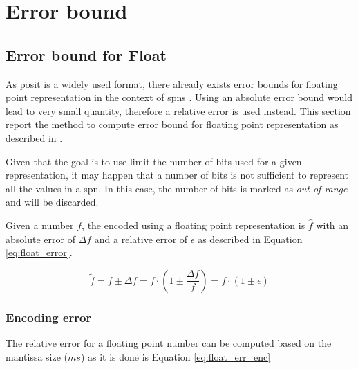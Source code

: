 
\chapter{Error bound}
\label{cha:eb}


\section{Error bound for Float}
As posit is a widely used format, there already exists error bounds for floating point representation in the context of \glspl{spn} \cite{errorbound_float}. Using an absolute error bound would lead to very small quantity, therefore a relative error is used instead. This section report the method to compute error bound for floating point representation as described in \cite{errorbound_float}.


\noindent Given that the goal is to use limit the number of bits used for a given representation, it may happen that a number of bits is not sufficient to represent all the values in a \gls{spn}. In this case, the number of bits is marked as \textit{out of range} and will be discarded.

\smallbreak

Given a number $f$, the encoded using a floating point representation is $\hat{f}$ with an absolute error of $\Delta f$ and a relative error of $\epsilon$ as described in Equation \ref{eq:float_error}.

\begin{equation}
	\tilde{f} = f \pm \Delta f = f \cdot \left(1 \pm \frac{\Delta f}{f} \right) = f \cdot (1 \pm \epsilon)
	\label{eq:float_error}
\end{equation}


\subsection{Encoding error}
The relative error for a floating point number can be computed based on the mantissa size ($ms$) as it is done is Equation \ref{eq:float_err_enc}

